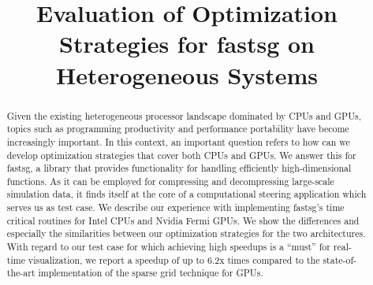 \documentclass[10pt, conference]{IEEEtran}
\begin{document}
\title{Evaluation of Optimization Strategies for fastsg on Heterogeneous Systems}
\author{
\and
{}
}

\maketitle

\begin{abstract}
Given the existing heterogeneous processor landscape dominated by CPUs and GPUs,
topics such as programming productivity and performance portability have become
increasingly important. In this context, an important question refers to how can
we develop optimization strategies that cover both CPUs and GPUs. We answer this
for fastsg, a library that provides functionality for handling efficiently
high-dimensional functions. As it can be employed for compressing and
decompressing large-scale simulation data, it finds itself at the core of a
computational steering application which serves us as test case. We describe our
experience with implementing fastsg's time critical routines for Intel CPUs and
Nvidia Fermi GPUs. We show the differences and especially the similarities
between our optimization strategies for the two architectures. With regard to
our test case for which achieving high speedups is a ``must'' for real-time
visualization, we report a speedup of up to 6.2x times compared to the
state-of-the-art implementation of the sparse grid technique for GPUs.
\end{abstract}



\end{document}
